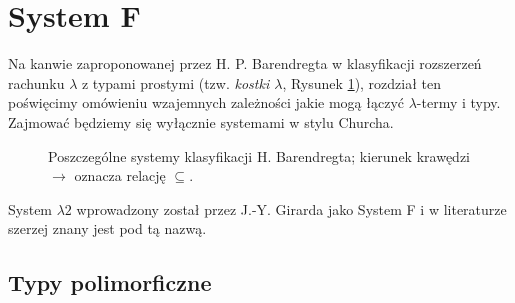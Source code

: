 \section{System F}

Na kanwie zaproponowanej przez H. P. Barendregta w \cite[Rozdział 5]{Barendregt_1992} klasyfikacji rozszerzeń rachunku \(\lambda\) z typami prostymi (tzw. \emph{kostki \(\lambda\)}, Rysunek \ref{fig:lambda-cube}), rozdział ten poświęcimy omówieniu wzajemnych zależności jakie mogą łączyć \(\lambda\)-termy i typy. Zajmować będziemy się wyłącznie systemami w stylu Churcha.

\begin{figure}[!h]
  \centering
  \caption{Poszczególne systemy klasyfikacji H. Barendregta; kierunek krawędzi \(\to\)  oznacza relację \(\subseteq\).}\label{fig:lambda-cube}
\end{figure}

System \(\lambda  2\) wprowadzony został przez J.-Y.  Girarda jako System
F i w literaturze szerzej znany jest pod tą nazwą. 

\subsection{Typy polimorficzne}

